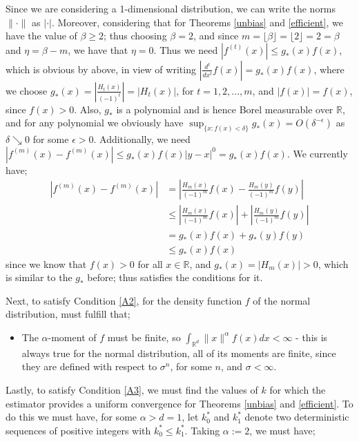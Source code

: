 \documentclass{report}
\begin{document}
\begin{itemize}
Since we are considering a 1-dimensional distribution, we can write the norms $\| \cdotp \|$ as  $| \cdotp |$. Moreover, considering that for Theorems \ref{unbias} and \ref{efficient}, we have the value of $\beta \geq 2$; thus choosing $\beta = 2$, and since $m = \lfloor \beta \rfloor =  \lfloor 2 \rfloor = 2 = \beta$ and $\eta = \beta -m$, we have that $\eta =0$. Thus we need  $|f^{(t)}(x)| \leq g_{*}(x) f(x)$, which is obvious by above, in view of writing $|\frac{d^t}{dx^t} f(x)| = g_{*}(x) f(x)$, where we choose $ g_{*}(x) = |\frac{H_{t}(x)}{(-1)^t}| = |H_{t}(x)|$, for $t=1,2,...,m$, and $|f(x)| = f(x)$, since $f(x) >0$. Also, $g_{*}$ is a polynomial and is hence Borel measurable over $\mathbb{R}$, and for any polynomial we obviously have $\sup_{\{x : f(x) < \delta\}} g_{*}(x) = O(\delta^{-\epsilon})$ as $\delta \searrow 0$ for some $\epsilon >0$. Additionally, we need $|f^{(m)}(x) - f^{(m)}(x)| \leq g_{*}(x) f(x)|y - x|^{0} = g_{*}(x) f(x)$. We currently have;
\begin{align*}
|f^{(m)}(x) - f^{(m)}(x)| &= \left| \frac{H_{m}(x)}{(-1)^m} f(x) - \frac{H_{m}(y)}{(-1)^m} f(y) \right| \\
&\leq \left| \frac{H_{m}(x)}{(-1)^m} f(x) \right| + \left| \frac{H_{m}(y)}{(-1)^m} f(y) \right| \\
&= g_{*}(x)f(x) + g_{*}(y)f(y) \\
&\leq g_{*}(x)f(x)
\end{align*}
since we know that $f(x) >0$ for all $x \in \mathbb{R}$, and $g_{*}(x) = |H_{m}(x)| >0$, which is similar to the $g_{*}$ before; thus satisfies the conditions for it.
\end{itemize}

Next, to satisfy Condition \ref{A2}, for the density function $f$ of the normal distribution, must fulfill that;
\begin{itemize}
\item The $\alpha$-moment of $f$ must be finite, so $\int_{\mathbb{R}^{d}} \| x \|^{\alpha} f(x) dx < \infty$ - this is always true for the normal distribution, all of its moments are finite, since they are defined with respect to $\sigma^n$, for some $n$, and $\sigma < \infty$.

\end{itemize}

Lastly, to satisfy Condition \ref{A3}, we must find the values of $k$ for which the estimator provides a uniform convergence for Theorems \ref{unbias} and \ref{efficient}. To do this we must have, for some $\alpha > d = 1$, let $k_{0}^{*}$ and $k_{1}^{*}$ denote two deterministic sequences of positive integers with $k_{0}^{*} \leq k_{1}^{*}$. Taking $\alpha := 2$, we must have;
\end{document}
